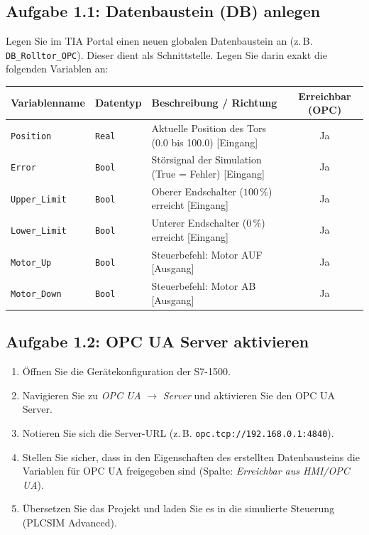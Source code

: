 \documentclass[11pt,a4paper]{article}
\begin{document}
\subsection{Aufgabe 1.1: Datenbaustein (DB) anlegen}
Legen Sie im TIA Portal einen neuen globalen Datenbaustein an (z.\,B. \texttt{DB\_Rolltor\_OPC}). Dieser dient als Schnittstelle. Legen Sie darin exakt die folgenden Variablen an:

\begin{table}[h]
    \centering
    \renewcommand{\arraystretch}{1.2}
    \begin{tabularx}{\textwidth}{@{} l l X c @{}}
        \toprule
        \textbf{Variablenname} & \textbf{Datentyp} & \textbf{Beschreibung / Richtung} & \textbf{Erreichbar (OPC)} \\
        \midrule
        \texttt{Position} & \texttt{Real} & Aktuelle Position des Tors (0.0 bis 100.0) [Eingang] & Ja \\
        \texttt{Error} & \texttt{Bool} & Störsignal der Simulation (True = Fehler) [Eingang] & Ja \\
        \texttt{Upper\_Limit} & \texttt{Bool} & Oberer Endschalter ($100\,\%$) erreicht [Eingang] & Ja \\
        \texttt{Lower\_Limit} & \texttt{Bool} & Unterer Endschalter ($0\,\%$) erreicht [Eingang] & Ja \\
        \texttt{Motor\_Up} & \texttt{Bool} & Steuerbefehl: Motor AUF [Ausgang] & Ja \\
        \texttt{Motor\_Down} & \texttt{Bool} & Steuerbefehl: Motor AB [Ausgang] & Ja \\
        \bottomrule
    \end{tabularx}
\end{table}

\subsection{Aufgabe 1.2: OPC UA Server aktivieren}
\begin{enumerate}[noitemsep]
    \item Öffnen Sie die Gerätekonfiguration der S7-1500.
    \item Navigieren Sie zu \textit{OPC UA} $\rightarrow$ \textit{Server} und aktivieren Sie den OPC UA Server.
    \item Notieren Sie sich die Server-URL (z.\,B. \texttt{opc.tcp://192.168.0.1:4840}).
    \item Stellen Sie sicher, dass in den Eigenschaften des erstellten Datenbausteins die Variablen für OPC UA freigegeben sind (Spalte: \textit{Erreichbar aus HMI/OPC UA}).
    \item Übersetzen Sie das Projekt und laden Sie es in die simulierte Steuerung (PLCSIM Advanced).
\end{enumerate}
\end{document}
